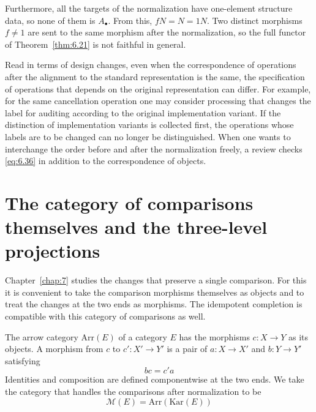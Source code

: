 \begin{example}
Furthermore, all the targets of the normalization have one-element structure data, so none
of them is $A_\bullet$.
From this, $fN=N=1N$.
Two distinct morphisms $f\ne1$ are sent to the same morphism after the normalization, so
the full functor of Theorem~\ref{thm:6.21} is not faithful in general.

Read in terms of design changes, even when the correspondence of operations after the
alignment to the standard representation is the same, the specification of operations that
depends on the original representation can differ.
For example, for the same cancellation operation one may consider processing that changes
the label for auditing according to the original implementation variant.
If the distinction of implementation variants is collected first, the operations whose
labels are to be changed can no longer be distinguished.
When one wants to interchange the order before and after the normalization freely, a review
checks \eqref{eq:6.36} in addition to the correspondence of objects.

\end{example}

\section{The category of comparisons themselves and the three-level projections}\label{sec:6.7}

Chapter~\ref{chap:7} studies the changes that preserve a single comparison.
For this it is convenient to take the comparison morphisms themselves as objects and to
treat the changes at the two ends as morphisms.
The idempotent completion is compatible with this category of comparisons as well.

\begin{definition}\label{def:6.26}

The arrow category $\mathrm{Arr}(E)$ of a category $E$ has the morphisms $c:X\to Y$ as its
objects.
A morphism from $c$ to $c':X'\to Y'$ is a pair of $a:X\to X'$ and $b:Y\to Y'$ satisfying
\begin{equation*}
bc=c'a
\tag{6.39}\label{eq:6.39}
\end{equation*}
Identities and composition are defined componentwise at the two ends.
We take the category that handles the comparisons after normalization to be
\begin{equation*}
\mathcal{M}(E)=\mathrm{Arr}(\mathrm{Kar}(E))
\tag{6.40}\label{eq:6.40}
\end{equation*}

\end{definition}

